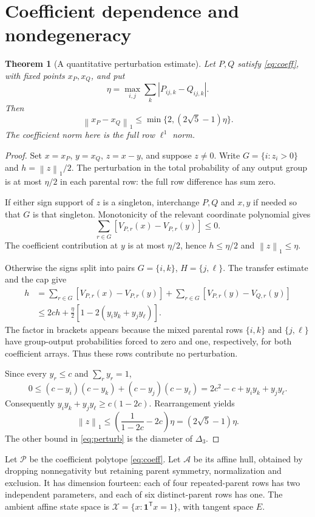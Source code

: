 \documentclass[11pt]{amsart}
\newtheorem{theorem}{Theorem}[section]
\theoremstyle{definition}
\newcommand{\D}{\Delta_3}
\newcommand{\one}{\mathbf 1}
\newcommand{\norm}[1]{\left\lVert#1\right\rVert_1}
\begin{document}
\section{Coefficient dependence and nondegeneracy}\label{sec:dependence}
\begin{theorem}[A quantitative perturbation estimate]\label{thm:perturb}
Let $P,Q$ satisfy \eqref{eq:coeff}, with fixed points $x_P,x_Q$, and put
\[
 \eta=\max_{i,j}\sum_k|P_{ij,k}-Q_{ij,k}|.
\]
Then
\begin{equation}\label{eq:perturb}
 \norm{x_P-x_Q}\le\min\{2,(2\sqrt5-1)\eta\}.
\end{equation}
The coefficient norm here is the full row $\ell^1$ norm.
\end{theorem}
\begin{proof}
Set $x=x_P$, $y=x_Q$, $z=x-y$, and suppose $z\ne0$. Write $G=\{i:z_i>0\}$ and $h=\norm z/2$. The perturbation in the total probability of any output group is at most $\eta/2$ in each parental row: the full row difference has sum zero.

If either sign support of $z$ is a singleton, interchange $P,Q$ and $x,y$ if needed so that $G$ is that singleton. Monotonicity of the relevant coordinate polynomial gives
\[
 \sum_{r\in G}[V_{P,r}(x)-V_{P,r}(y)]\le0.
\]
The coefficient contribution at $y$ is at most $\eta/2$, hence $h\le\eta/2$ and $\norm z\le\eta$.

Otherwise the signs split into pairs $G=\{i,k\}$, $H=\{j,\ell\}$. The transfer estimate and the cap give
\begin{align*}
 h&=\sum_{r\in G}[V_{P,r}(x)-V_{P,r}(y)]
      +\sum_{r\in G}[V_{P,r}(y)-V_{Q,r}(y)]\\
  &\le2ch+\frac\eta2[1-2(y_iy_k+y_jy_\ell)].
\end{align*}
The factor in brackets appears because the mixed parental rows $\{i,k\}$ and $\{j,\ell\}$ have group-output probabilities forced to zero and one, respectively, for both coefficient arrays. Thus these rows contribute no perturbation.

Since every $y_r\le c$ and $\sum_r y_r=1$,
\[
 0\le(c-y_i)(c-y_k)+(c-y_j)(c-y_\ell)
     =2c^2-c+y_iy_k+y_jy_\ell.
\]
Consequently $y_iy_k+y_jy_\ell\ge c(1-2c)$. Rearrangement yields
\[
 \norm z\le\left(\frac1{1-2c}-2c\right)\eta
             =(2\sqrt5-1)\eta.
\]
The other bound in \eqref{eq:perturb} is the diameter of $\D$.
\end{proof}

Let $\mathcal P$ be the coefficient polytope \eqref{eq:coeff}. Let $\mathscr A$ be its affine hull, obtained by dropping nonnegativity but retaining parent symmetry, normalization and exclusion. It has dimension fourteen: each of four repeated-parent rows has two independent parameters, and each of six distinct-parent rows has one. The ambient affine state space is $\mathscr X=\{x:\one^{\mathsf T}x=1\}$, with tangent space $E$.
\end{document}
